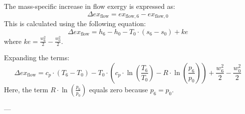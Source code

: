 The mass-specific increase in flow exergy is expressed as:  
\[
\Delta ex_{\text{flow}} = ex_{\text{flow},6} - ex_{\text{flow},0}
\]  
This is calculated using the following equation:  
\[
\Delta ex_{\text{flow}} = h_6 - h_0 - T_0 \cdot (s_6 - s_0) + ke
\]  
where \( ke = \frac{w_6^2}{2} - \frac{w_0^2}{2} \).  

Expanding the terms:  
\[
\Delta ex_{\text{flow}} = c_p \cdot (T_6 - T_0) - T_0 \cdot \left( c_p \cdot \ln \left( \frac{T_6}{T_0} \right) - R \cdot \ln \left( \frac{p_6}{p_0} \right) \right) + \frac{w_6^2}{2} - \frac{w_0^2}{2}
\]  
Here, the term \( R \cdot \ln \left( \frac{p_6}{p_0} \right) \) equals zero because \( p_6 = p_0 \).  

---